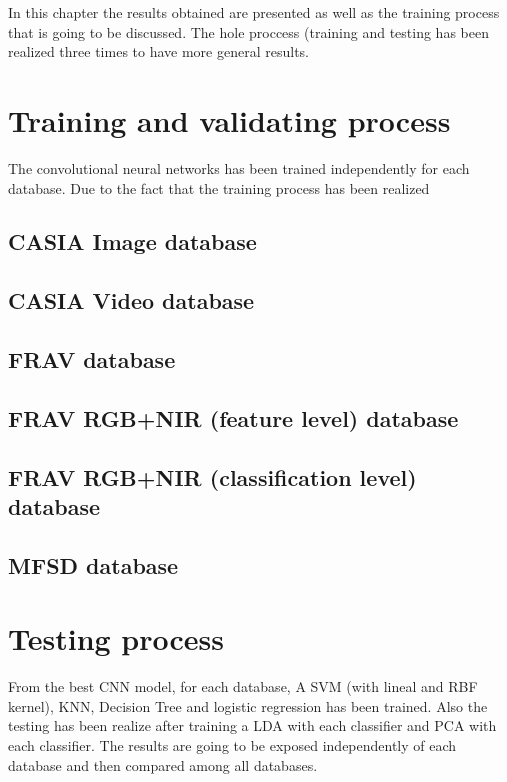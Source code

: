 In this chapter the results obtained are presented as well as the training process that is going to be discussed. The hole proccess (training and testing has been realized three times to have more general results.


\section{Training and validating process}
The convolutional neural networks has been trained independently for each database.  Due to the fact that the training process has been realized 

\subsection{CASIA Image database}

\subsection{CASIA Video database}

\subsection{FRAV database}

\subsection{FRAV RGB+NIR (feature level) database}

\subsection{FRAV RGB+NIR (classification level) database}

\subsection{MFSD database}


\section{Testing process}
From the best CNN model, for each database, A SVM (with lineal and RBF kernel), KNN, Decision Tree and logistic regression has been trained. Also the testing has been realize after training a LDA with each classifier and PCA with each classifier. The results are going to be exposed independently of each database and then compared among all databases.\\